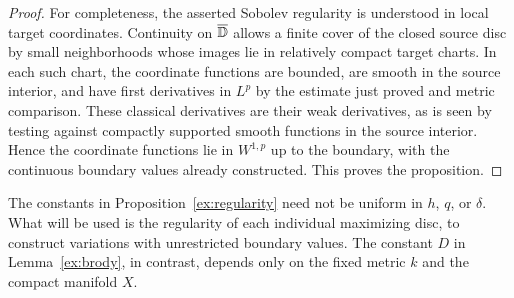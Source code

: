 \begin{proof}
For completeness, the asserted Sobolev regularity is understood in
local target coordinates. Continuity on $\overline{\mathbb D}$ allows a finite
cover of the closed source disc by small neighborhoods whose images
lie in relatively compact target charts. In each such chart, the
coordinate functions are bounded, are smooth in the source interior,
and have first derivatives in $L^p$ by the estimate just proved and
metric comparison. These classical derivatives are their weak
derivatives, as is seen by testing against compactly supported smooth
functions in the source interior. Hence the coordinate functions lie
in $W^{1,p}$ up to the boundary, with the continuous boundary values
already constructed. This proves the proposition.
\end{proof}

\begin{remark}
The constants in Proposition~\ref{ex:regularity} need not be uniform
in $h$, $q$, or $\delta$. What will be used is the regularity of each
individual maximizing disc, to construct variations with unrestricted
boundary values. The constant $D$ in Lemma~\ref{ex:brody}, in contrast,
depends only on the fixed metric $k$ and the compact manifold $X$.
\end{remark}
